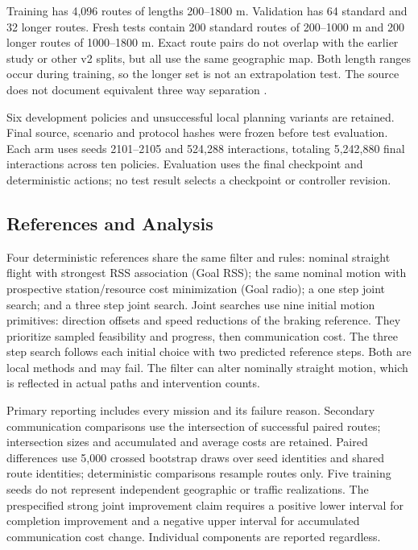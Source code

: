 \documentclass[conference]{IEEEtran}
\begin{document}
Training has 4,096 routes of lengths 200--1800 m. Validation has 64 standard and
32 longer routes. Fresh tests contain 200 standard routes of 200--1000 m and
200 longer routes of 1000--1800 m. Exact route pairs do not overlap with the
earlier study or other v2 splits, but all use the same geographic map. Both
length ranges occur during training, so the longer set is not an extrapolation
test. The source does not document equivalent three way separation
\cite[pp.~15--16, Secs.~6.2--6.3]{thesis}.

Six development policies and unsuccessful local planning variants are retained.
Final source, scenario and protocol hashes were frozen before test evaluation.
Each arm uses seeds 2101--2105 and 524,288 interactions, totaling 5,242,880 final
interactions across ten policies. Evaluation uses the final checkpoint and
deterministic actions; no test result selects a checkpoint or controller revision.

\subsection{References and Analysis}
Four deterministic references share the same filter and rules: nominal straight
flight with strongest RSS association (Goal RSS); the same nominal motion with
prospective station/resource cost minimization (Goal radio); a one step joint
search; and a three step joint search. Joint searches use nine initial motion
primitives: direction offsets and speed reductions of the braking reference.
They prioritize sampled feasibility and progress, then communication cost.
The three step search follows each initial choice with two predicted reference
steps. Both are local methods and may fail. The filter can alter nominally
straight motion, which is reflected in actual paths and intervention counts.

Primary reporting includes every mission and its failure reason. Secondary
communication comparisons use the intersection of successful paired routes;
intersection sizes and accumulated and average costs are retained. Paired
differences use 5,000 crossed bootstrap draws over seed identities and shared
route identities; deterministic comparisons resample routes only. Five training
seeds do not represent independent geographic or traffic realizations. The
prespecified strong joint improvement claim requires a positive lower interval
for completion improvement and a negative upper interval for accumulated
communication cost change. Individual components are reported regardless.
\end{document}
